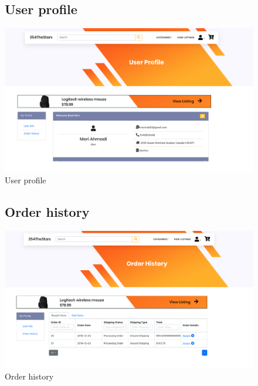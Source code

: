 \documentclass[11pt]{article}
\begin{document}
\begin{figure}[ht!]
    \subsection{User profile}
    \centering
    \includegraphics[width=\textwidth,height=0.3\paperheight,keepaspectratio]{Diagrams/External_Interfaces/User_Profile.png}
    \caption{User profile}
    \label{fig: Latest listings}
\end{figure}
\FloatBarrier

\begin{figure}[ht!]
    \subsection{Order history}
    \centering
    \includegraphics[width=\textwidth,height=0.3\paperheight,keepaspectratio]{Diagrams/External_Interfaces/Order_History.png}
    \caption{Order history}
    \label{fig: Latest listings}
\end{figure}
\FloatBarrier
\end{document}
